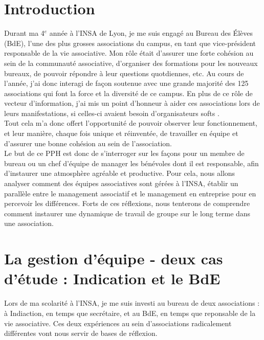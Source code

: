 


\maketitle
\newpage

\section{Introduction}
Durant ma 4$^e$ année à l'INSA de Lyon, je me suis engagé au Bureau des Élèves (BdE), l'une des plus grosses associations du campus, en tant que vice-président responsable de la vie associative. Mon rôle était d'assurer une forte cohésion au sein de la communauté associative, d'organiser des formations pour les nouveaux bureaux, de pouvoir répondre à leur questions quotdiennes, etc. Au cours de l'année, j'ai donc interagi de façon soutenue avec une grande majorité des 125 associations qui font la force et la diversité de ce campus. En plus de ce rôle de vecteur d'information, j'ai mis un point d'honneur à aider ces associations lors de leurs manifestations, si celles-ci avaient besoin d'organisateurs \og softs \fg{}. \\

Tout cela m'a donc offert l'opportunité de pouvoir observer leur fonctionnement, et leur manière, chaque fois unique et réinventée, de travailler en équipe et d'assurer une bonne cohésion au sein de l'association.\\

Le but de ce PPH est donc de s'interroger sur les façons pour un membre de bureau ou un chef d'équipe de \og manager \fg{} les bénévoles dont il est responsable, afin d'instaurer une atmosphère agréable et productive. Pour cela, nous allons analyser comment des équipes associatives sont gérées à l'INSA, établir un parallèle entre le management associatif et le management en entreprise pour en percevoir les différences. Forts de ces réflexions, nous tenterons de comprendre comment instaurer une dynamique de travail de groupe sur le long terme dans une association.

\section{La gestion d'équipe - deux cas d'étude : Indication et le BdE}
Lors de ma scolarité à l'INSA, je me suis investi au bureau de deux associations : à Indiaction, en temps que secrétaire, et au BdE, en temps que reponsable de la vie associative. Ces deux expériences au sein d'associations radicalement différentes vont nous servir de bases de réflexion.\

